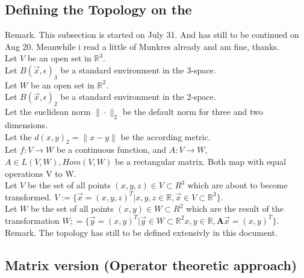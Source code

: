 \documentclass[a4paper]{article}
\begin{document}
\subsection{Defining the Topology on the }

Remark. This subsection is started on July 31. And has still to be continued on Aug 20. Meanwhile i read a little of Munkres already and am fine, thanks.\\

Let $V$ be an open set in $\mathbb{R}^{3}$.\\

Let $B(\vec{x}, \epsilon)_{3}$ be a standard environment in the 3-space.\\

Let $W$ be an open set in $\mathbb{R}^{2}$.\\

Let $B(\vec{x}, \epsilon)_{2}$ be a standard environment in the 2-space.\\

Let the euclidean norm $\|\cdot\|_{2}$ be the default norm for three and two dimensions.\\

Let the $d(x,y)_{2} = \|x-y\|$ be the according metric.\\

Let $f:V\rightarrow W$ be a continuous function, and $A:V\rightarrow W$, $A \in L(V,W), Hom(V,W)$ be a rectangular matrix. Both map with equal operations V to W.\\

Let $V$ be the set of all points $(x,y,z) \in V \subset R^3$ which are about to become transformed. $V := \{ \vec{x}=(x,y,z)^T | x,y,z \in \mathbb{R}, \vec{x} \in V \subset \mathbb{R}^{3} \}$.\\

Let $W$ be the set of all points $(x,y) \in W \subset R^2$ which are the result of the transformation $W ;= \{ \vec{y}=(x,y)^T | \vec{y} \in W \subset \mathbb{R}^{2} x,y \in \mathbb{R}, \boldsymbol{A}\vec{x}=(x,y)^{T}\}$.\\

Remark. The topology has still to be defined extensivly in this document.\\



\subsection{Matrix version (Operator theoretic approach)}
\end{document}
